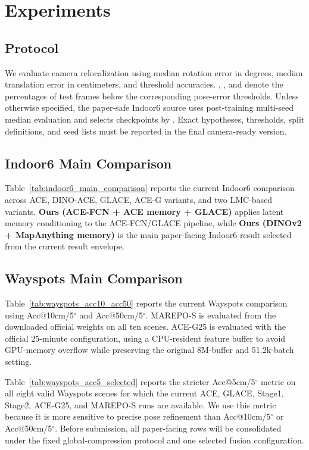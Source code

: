 \section{Experiments}

\subsection{Protocol}

We evaluate camera relocalization using median rotation error in degrees, median translation error in centimeters, and threshold accuracies. \acctwentyfive{}, \accten{}, and \accfive{} denote the percentages of test frames below the corresponding pose-error thresholds. Unless otherwise specified, the paper-safe Indoor6 source uses post-training multi-seed median evaluation and selects checkpoints by \accfive{}. Exact hypotheses, thresholds, split definitions, and seed lists must be reported in the final camera-ready version.

\subsection{Indoor6 Main Comparison}

Table~\ref{tab:indoor6_main_comparison} reports the current Indoor6 comparison across ACE, DINO-ACE, GLACE, ACE-G variants, and two LMC-based variants. \textbf{Ours (ACE-FCN + ACE memory + GLACE)} applies latent memory conditioning to the ACE-FCN/GLACE pipeline, while \textbf{Ours (DINOv2 + MapAnything memory)} is the main paper-facing Indoor6 result selected from the current result envelope.



\subsection{Wayspots Main Comparison}

Table~\ref{tab:wayspots_acc10_acc50} reports the current Wayspots comparison using Acc@10cm/5$^\circ$ and Acc@50cm/5$^\circ$. MAREPO-S is evaluated from the downloaded official weights on all ten scenes. ACE-G25 is evaluated with the official 25-minute configuration, using a CPU-resident feature buffer to avoid GPU-memory overflow while preserving the original 8M-buffer and 51.2k-batch setting.



Table~\ref{tab:wayspots_acc5_selected} reports the stricter Acc@5cm/5$^\circ$ metric on all eight valid Wayspots scenes for which the current ACE, GLACE, Stage1, Stage2, ACE-G25, and MAREPO-S runs are available. We use this metric because it is more sensitive to precise pose refinement than Acc@10cm/5$^\circ$ or Acc@50cm/5$^\circ$. Before submission, all paper-facing rows will be consolidated under the fixed global-compression protocol and one selected fusion configuration.

